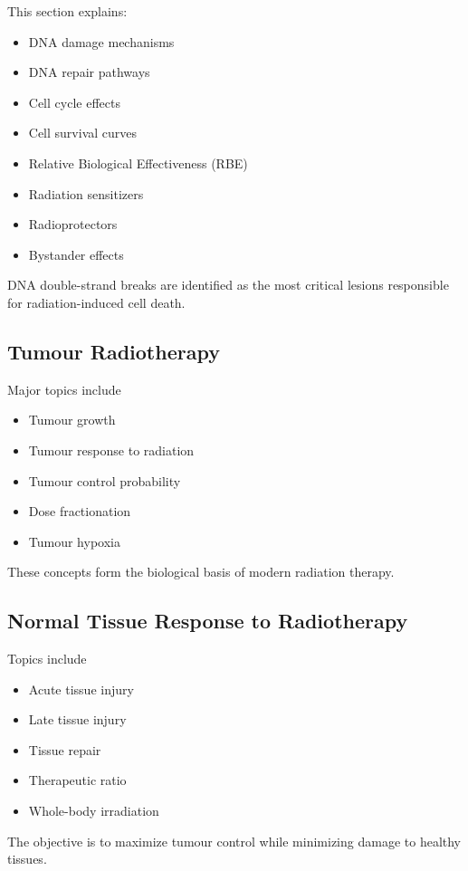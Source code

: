 \documentclass[12pt]{article}
\begin{document}
This section explains:

\begin{itemize}
\item DNA damage mechanisms
\item DNA repair pathways
\item Cell cycle effects
\item Cell survival curves
\item Relative Biological Effectiveness (RBE)
\item Radiation sensitizers
\item Radioprotectors
\item Bystander effects
\end{itemize}

DNA double-strand breaks are identified as the most critical lesions responsible for radiation-induced cell death.

\subsection{Tumour Radiotherapy}

Major topics include

\begin{itemize}
\item Tumour growth
\item Tumour response to radiation
\item Tumour control probability
\item Dose fractionation
\item Tumour hypoxia
\end{itemize}

These concepts form the biological basis of modern radiation therapy.

\subsection{Normal Tissue Response to Radiotherapy}

Topics include

\begin{itemize}
\item Acute tissue injury
\item Late tissue injury
\item Tissue repair
\item Therapeutic ratio
\item Whole-body irradiation
\end{itemize}

The objective is to maximize tumour control while minimizing damage to healthy tissues.
\end{document}
